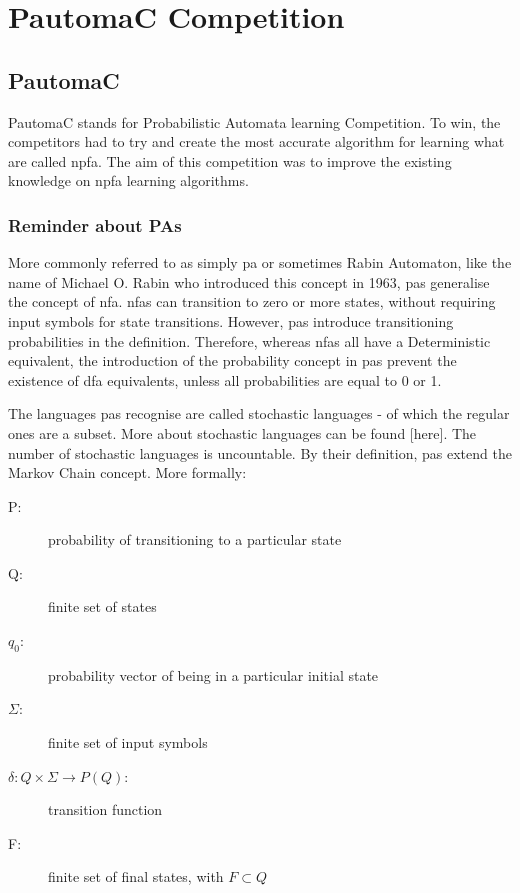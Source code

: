 \section{PautomaC Competition}

\subsection{PautomaC}

PautomaC stands for Probabilistic Automata learning Competition. To
win, the competitors had to try and create the most accurate algorithm
for learning what are called \gls{npfa}. The aim of this competition was to improve
the existing knowledge on \gls{npfa} learning algorithms.


\subsubsection{Reminder about PAs}

More commonly referred to as simply \gls{pa} or
sometimes Rabin Automaton, like the name of Michael O. Rabin who introduced
this concept in 1963, \gls{pa}s generalise the concept of \gls{nfa}. \gls{nfa}s can transition to zero or more states,
without requiring input symbols for state transitions. However, \gls{pa}s
introduce transitioning probabilities in the definition. Therefore,
whereas \gls{nfa}s all have a Deterministic equivalent, the introduction
of the probability concept in \gls{pa}s prevent the existence of \gls{dfa} equivalents,
unless all probabilities are equal to 0 or 1.

The languages \gls{pa}s recognise are called stochastic languages - of which
the regular ones are a subset. More about stochastic languages can
be found {[}here{]}. The number of stochastic languages is uncountable.
By their definition, \gls{pa}s extend the Markov Chain concept. More formally:

\begin{description}
	\item [{P:}] probability of transitioning to a particular state
	\item [{Q:}] finite set of states
	\item [{$q_{0}$:}] probability vector of being in a particular initial
	state
	\item [{$\varSigma$:}] finite set of input symbols
	\item [{$\delta:Q\times\varSigma\longrightarrow P(Q)$:}] transition function
	\item [{F:}] finite set of final states, with $F\subset Q$
\end{description}

